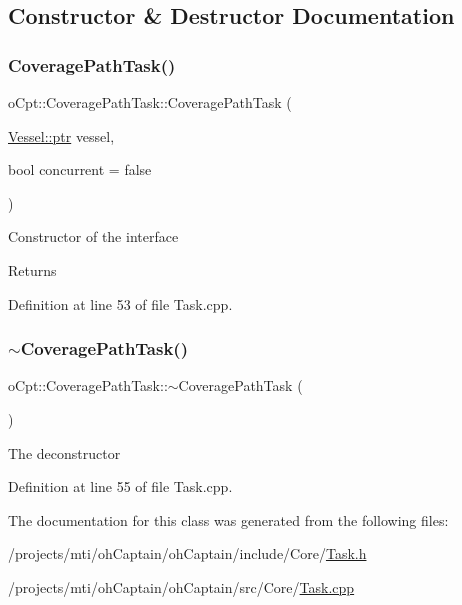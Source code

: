 \subsection{Constructor \& Destructor Documentation}
\hypertarget{classo_cpt_1_1_coverage_path_task_ad08940ffc37098818fc119d6ea2d53f2}{}\label{classo_cpt_1_1_coverage_path_task_ad08940ffc37098818fc119d6ea2d53f2} 
\subsubsection{\texorpdfstring{Coverage\+Path\+Task()}{CoveragePathTask()}}
{\footnotesize\ttfamily o\+Cpt\+::\+Coverage\+Path\+Task\+::\+Coverage\+Path\+Task (\begin{DoxyParamCaption}\item[{\hyperlink{classo_cpt_1_1i_vessel_a43711a596f3bdfd0ca732ed3901edc97}{Vessel\+::ptr}}]{vessel,  }\item[{bool}]{concurrent = {\ttfamily false} }\end{DoxyParamCaption})}

Constructor of the interface \begin{DoxyReturn}{Returns}

\end{DoxyReturn}


Definition at line 53 of file Task.\+cpp.

\hypertarget{classo_cpt_1_1_coverage_path_task_a8773343bb232c3a22b8ec6acf483bee1}{}\label{classo_cpt_1_1_coverage_path_task_a8773343bb232c3a22b8ec6acf483bee1} 
\subsubsection{\texorpdfstring{$\sim$\+Coverage\+Path\+Task()}{~CoveragePathTask()}}
{\footnotesize\ttfamily o\+Cpt\+::\+Coverage\+Path\+Task\+::$\sim$\+Coverage\+Path\+Task (\begin{DoxyParamCaption}{ }\end{DoxyParamCaption})\hspace{0.3cm}{\ttfamily [virtual]}}

The deconstructor 

Definition at line 55 of file Task.\+cpp.



The documentation for this class was generated from the following files\+:\begin{DoxyCompactItemize}
\item 
/projects/mti/oh\+Captain/oh\+Captain/include/\+Core/\hyperlink{_task_8h}{Task.\+h}\item 
/projects/mti/oh\+Captain/oh\+Captain/src/\+Core/\hyperlink{_task_8cpp}{Task.\+cpp}\end{DoxyCompactItemize}

